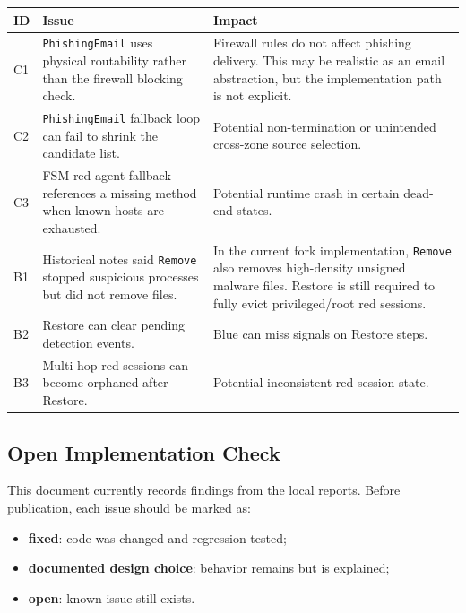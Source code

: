 \begin{longtable}{p{}p{}p{}}
\toprule
\textbf{ID} & \textbf{Issue} & \textbf{Impact} \\
\midrule
C1 & \texttt{PhishingEmail} uses physical routability rather than the firewall blocking check. & Firewall rules do not affect phishing delivery. This may be realistic as an email abstraction, but the implementation path is not explicit. \\
C2 & \texttt{PhishingEmail} fallback loop can fail to shrink the candidate list. & Potential non-termination or unintended cross-zone source selection. \\
C3 & FSM red-agent fallback references a missing method when known hosts are exhausted. & Potential runtime crash in certain dead-end states. \\
B1 & Historical notes said \texttt{Remove} stopped suspicious processes but did not remove files. & In the current fork implementation, \texttt{Remove} also removes high-density unsigned malware files. Restore is still required to fully evict privileged/root red sessions. \\
B2 & Restore can clear pending detection events. & Blue can miss signals on Restore steps. \\
B3 & Multi-hop red sessions can become orphaned after Restore. & Potential inconsistent red session state. \\
\bottomrule
\end{longtable}

\subsection{Open Implementation Check}

This document currently records findings from the local reports. Before publication, each issue should be marked as:
\begin{itemize}
  \item \textbf{fixed}: code was changed and regression-tested;
  \item \textbf{documented design choice}: behavior remains but is explained;
  \item \textbf{open}: known issue still exists.
\end{itemize}

